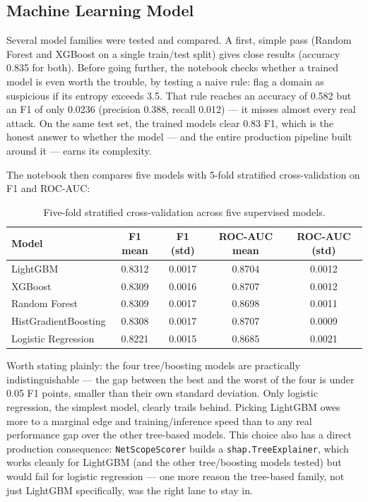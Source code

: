 \subsection*{Machine Learning Model}
Several model families were tested and compared. A first, simple pass
(Random Forest and XGBoost on a single train/test split) gives close
results (accuracy 0.835 for both). Before going further, the notebook
checks whether a trained model is even worth the trouble, by testing a
naive rule: flag a domain as suspicious if its entropy exceeds 3.5. That
rule reaches an accuracy of 0.582 but an F1 of only 0.0236 (precision
0.388, recall 0.012) --- it misses almost every real attack. On the same
test set, the trained models clear 0.83 F1, which is the honest answer to
whether the model --- and the entire production pipeline built around it
--- earns its complexity.

The notebook then compares five models with 5-fold stratified
cross-validation on F1 and ROC-AUC:

\begin{table}[h]
\centering
\small
\begin{tabular}{@{}lcccc@{}}
\toprule
\textbf{Model} & \textbf{F1 mean} & \textbf{F1 (std)} & \textbf{ROC-AUC mean} & \textbf{ROC-AUC (std)} \\
\midrule
LightGBM              & 0.8312 & 0.0017 & 0.8704 & 0.0012 \\
XGBoost                & 0.8309 & 0.0016 & 0.8707 & 0.0012 \\
Random Forest           & 0.8309 & 0.0017 & 0.8698 & 0.0011 \\
HistGradientBoosting    & 0.8308 & 0.0017 & 0.8707 & 0.0009 \\
Logistic Regression     & 0.8221 & 0.0015 & 0.8685 & 0.0021 \\
\bottomrule
\end{tabular}
\caption{Five-fold stratified cross-validation across five supervised models.}
\end{table}

Worth stating plainly: the four tree/boosting models are practically
indistinguishable --- the gap between the best and the worst of the four is
under 0.05 F1 points, smaller than their own standard deviation. Only
logistic regression, the simplest model, clearly trails behind. Picking
LightGBM owes more to a marginal edge and training/inference speed than to
any real performance gap over the other tree-based models. This choice also
has a direct production consequence: \texttt{NetScopeScorer} builds a
\texttt{shap.TreeExplainer}, which works cleanly for LightGBM (and the
other tree/boosting models tested) but would fail for logistic regression
--- one more reason the tree-based family, not just LightGBM specifically,
was the right lane to stay in.

